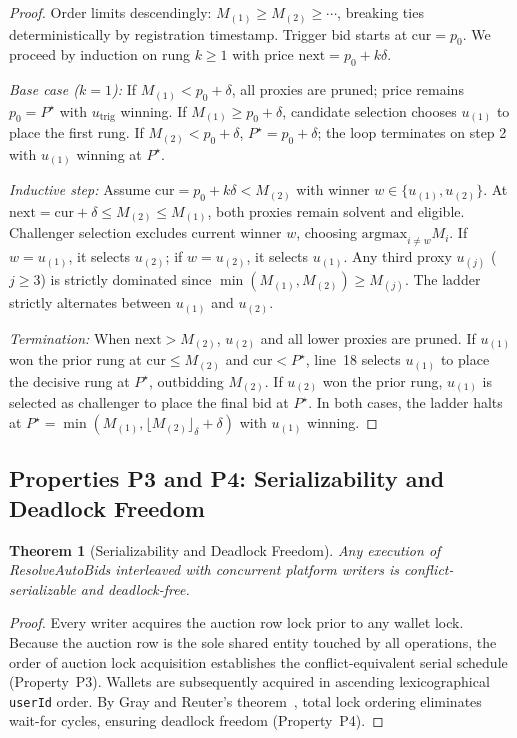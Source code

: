 \documentclass[conference]{IEEEtran}
\newtheorem{theorem}{Theorem}
\begin{document}
\begin{proof}
Order limits descendingly: $M_{(1)} \geq M_{(2)} \geq \cdots$, breaking ties deterministically
by registration timestamp. Trigger bid starts at $\text{cur} = p_0$. We proceed by induction on
rung $k \geq 1$ with price $\text{next} = p_0 + k\delta$.

\emph{Base case ($k=1$):} If $M_{(1)} < p_0 + \delta$, all proxies are pruned; price remains
$p_0 = P^\star$ with $u_{\text{trig}}$ winning. If $M_{(1)} \geq p_0 + \delta$, candidate
selection chooses $u_{(1)}$ to place the first rung. If $M_{(2)} < p_0 + \delta$, $P^\star = p_0 + \delta$;
the loop terminates on step 2 with $u_{(1)}$ winning at $P^\star$.

\emph{Inductive step:} Assume $\text{cur} = p_0 + k\delta < M_{(2)}$ with winner $w \in \{u_{(1)}, u_{(2)}\}$.
At $\text{next} = \text{cur} + \delta \leq M_{(2)} \leq M_{(1)}$, both proxies remain solvent and eligible.
Challenger selection excludes current winner $w$, choosing $\text{argmax}_{i \neq w} M_i$. If $w = u_{(1)}$,
it selects $u_{(2)}$; if $w = u_{(2)}$, it selects $u_{(1)}$. Any third proxy $u_{(j)}$ ($j \geq 3$)
is strictly dominated since $\min(M_{(1)}, M_{(2)}) \geq M_{(j)}$. The ladder strictly alternates
between $u_{(1)}$ and $u_{(2)}$.

\emph{Termination:} When $\text{next} > M_{(2)}$, $u_{(2)}$ and all lower proxies are pruned.
If $u_{(1)}$ won the prior rung at $\text{cur} \leq M_{(2)}$ and $\text{cur} < P^\star$,
line~18 selects $u_{(1)}$ to place the decisive rung at $P^\star$, outbidding $M_{(2)}$.
If $u_{(2)}$ won the prior rung, $u_{(1)}$ is selected as challenger to place the final bid at $P^\star$.
In both cases, the ladder halts at $P^\star = \min(M_{(1)}, \lfloor M_{(2)} \rfloor_\delta + \delta)$
with $u_{(1)}$ winning.
\end{proof}

\subsection{Properties P3 and P4: Serializability and Deadlock Freedom}
\begin{theorem}[Serializability and Deadlock Freedom]
Any execution of ResolveAutoBids interleaved with concurrent platform writers is
conflict-serializable and deadlock-free.
\end{theorem}

\begin{proof}
Every writer acquires the auction row lock prior to any wallet lock. Because the auction row
is the sole shared entity touched by all operations, the order of auction lock acquisition
establishes the conflict-equivalent serial schedule (Property~P3). Wallets are subsequently
acquired in ascending lexicographical \texttt{userId} order. By Gray and Reuter's
theorem~\cite{Gray1992}, total lock ordering eliminates wait-for cycles, ensuring deadlock
freedom (Property~P4).
\end{proof}
\end{document}
